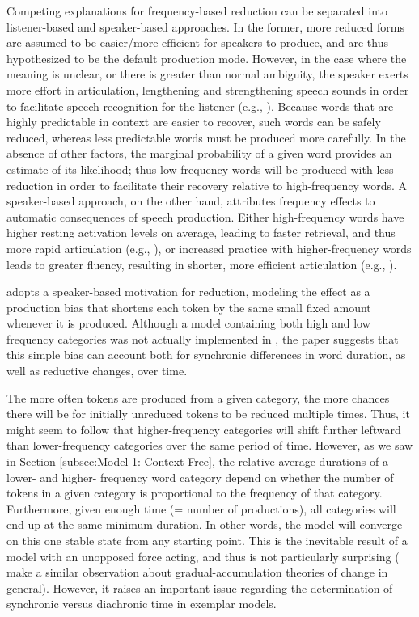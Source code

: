 Competing explanations for frequency-based reduction can be separated
into listener-based and speaker-based approaches. In the former, more
reduced forms are assumed to be easier/more efficient for speakers
to produce, and are thus hypothesized to be the default production
mode. However, in the case where the meaning is unclear, or there
is greater than normal ambiguity, the speaker exerts more effort in
articulation, lengthening and strengthening speech sounds in order
to facilitate speech recognition for the listener (e.g., \citealp{Aylett2004}).
Because words that are highly predictable in context are easier to
recover, such words can be safely reduced, whereas less predictable
words must be produced more carefully. In the absence of other factors,
the marginal probability of a given word provides an estimate of its
likelihood; thus low-frequency words will be produced with less reduction
in order to facilitate their recovery relative to high-frequency words.
A speaker-based approach, on the other hand, attributes frequency
effects to automatic consequences of speech production. Either high-frequency
words have higher resting activation levels on average, leading to
faster retrieval, and thus more rapid articulation (e.g., \citeauthor{gahl2012reduce}),
or increased practice with higher-frequency words leads to greater
fluency, resulting in shorter, more efficient articulation (e.g.,
\citealt{Bybee2002}).

\citet{Pierrehumbert2000} adopts a speaker-based motivation for reduction,
modeling the effect as a production bias that shortens each token
by the same small fixed amount whenever it is produced. Although a
model containing both high and low frequency categories was not actually
implemented in \citet{Pierrehumbert2000}, the paper suggests that
this simple bias can account both for synchronic differences in word
duration, as well as reductive changes, over time. 

The more often tokens are produced from a given category, the more
chances there will be for initially unreduced tokens to be reduced
multiple times. Thus, it might seem to follow that higher-frequency
categories will shift further leftward than lower-frequency categories
over the same period of time. However, as we saw in Section \ref{subsec:Model-1:-Context-Free},
the relative average durations of a lower- and higher- frequency word
category depend on whether the number of tokens in a given category
is proportional to the frequency of that category. Furthermore, given
enough time (= number of productions), all categories will end up
at the same minimum duration. In other words, the model will converge
on this one stable state from any starting point. This is the inevitable
result of a model with an unopposed force acting, and thus is not
particularly surprising (\citet{Baker2011} make a similar observation
about gradual-accumulation theories of change in general). However,
it raises an important issue regarding the determination of synchronic
versus diachronic time in exemplar models. 

